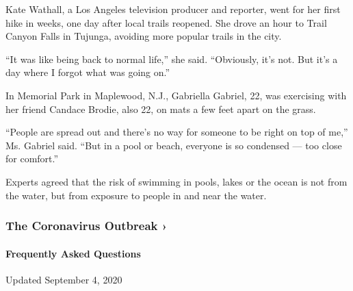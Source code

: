 Kate Wathall, a Los Angeles television producer and reporter, went for
her first hike in weeks, one day after local trails reopened. She drove
an hour to Trail Canyon Falls in Tujunga, avoiding more popular trails
in the city.

``It was like being back to normal life,'' she said. ``Obviously, it's
not. But it's a day where I forgot what was going on.''

In Memorial Park in Maplewood, N.J., Gabriella Gabriel, 22, was
exercising with her friend Candace Brodie, also 22, on mats a few feet
apart on the grass.

``People are spread out and there's no way for someone to be right on
top of me,'' Ms. Gabriel said. ``But in a pool or beach, everyone is so
condensed --- too close for comfort.''

Experts agreed that the risk of swimming in pools, lakes or the ocean is
not from the water, but from exposure to people in and near the water.

\href{https://www.nytimes3xbfgragh.onion/news-event/coronavirus?action=click\&pgtype=Article\&state=default\&region=MAIN_CONTENT_3\&context=storylines_faq}{}

\hypertarget{the-coronavirus-outbreak-}{%
\subsubsection{The Coronavirus Outbreak
›}\label{the-coronavirus-outbreak-}}

\hypertarget{frequently-asked-questions}{%
\paragraph{Frequently Asked
Questions}\label{frequently-asked-questions}}

Updated September 4, 2020

